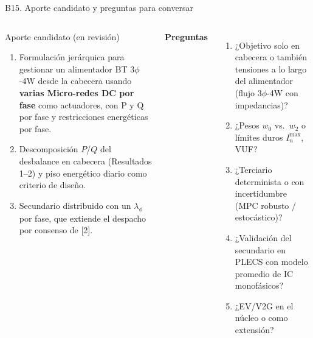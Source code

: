 \documentclass[aspectratio=169,10pt,t]{beamer}
\begin{document}
\begin{frame}{B15. Aporte candidato y preguntas para conversar}
  \begin{columns}[T,onlytextwidth]
    \begin{exampleblock}{Aporte candidato (en revisión)}
      \footnotesize
      \begin{enumerate}\setlength\itemsep{2pt}
        \item Formulación jerárquica para gestionar un alimentador BT 3$\phi$-4W desde la cabecera usando \textbf{varias Micro-redes DC por fase} como actuadores, con P y Q por fase y restricciones energéticas por fase.
        \item Descomposición $P$/$Q$ del desbalance en cabecera (Resultados 1--2) y piso energético diario como criterio de diseño.
        \item Secundario distribuido con un $\lambda_\phi$ por fase, que extiende el despacho por consenso de [2].
      \end{enumerate}
    \end{exampleblock}
    \footnotesize\textbf{\color{usachT}Preguntas}
    \begin{enumerate}\setlength\itemsep{2pt}
      \item ¿Objetivo solo en cabecera o también tensiones a lo largo del alimentador (flujo 3$\phi$-4W con impedancias)?
      \item ¿Pesos $w_0$ vs.\ $w_2$ o límites duros $I_n^{\max}$, VUF?
      \item ¿Terciario determinista o con incertidumbre (MPC robusto / estocástico)?
      \item ¿Validación del secundario en PLECS con modelo promedio de IC monofásicos?
      \item ¿EV/V2G en el núcleo o como extensión?
    \end{enumerate}
  \end{columns}
\end{frame}
\end{document}
